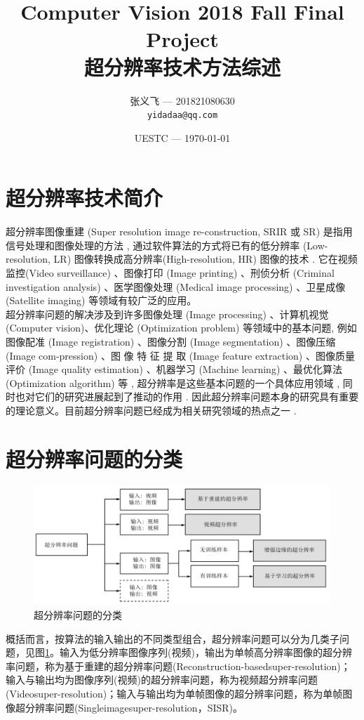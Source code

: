 \documentclass[]{article}
\title{Computer Vision 2018 Fall Final Project \\ \textbf{超分辨率技术方法综述}}
\author{张义飞 --- 201821080630\\ \texttt{yidadaa@qq.com}}
\date{\small{UESTC --- \today}}
\begin{document}
    \maketitle

    \section{超分辨率技术简介}
    超分辨率图像重建 (Super resolution image re-construction, SRIR 或 SR) 是指用信号处理和图像处理的方法 , 通过软件算法的方式将已有的低分辨率 (Low-resolution, LR) 图像转换成高分辨率(High-resolution, HR) 图像的技术 . 它在视频监控(Video surveillance) 、图像打印 (Image printing) 、刑侦分析 (Criminal investigation analysis) 、医学图像处理 (Medical image processing) 、卫星成像(Satellite imaging) 等领域有较广泛的应用。\\

    超分辨率问题的解决涉及到许多图像处理 (Image processing) 、计算机视觉 (Computer vision)、优化理论 (Optimization problem) 等领域中的基本问题, 例如图像配准 (Image registration) 、图像分割 (Image segmentation) 、图像压缩 (Image com-pression) 、图 像 特 征 提 取 (Image feature extraction) 、图像质量评价 (Image quality estimation) 、机器学习 (Machine learning) 、最优化算法 (Optimization algorithm) 等 , 超分辨率是这些基本问题的一个具体应用领域 , 同时也对它们的研究进展起到了推动的作用 . 因此超分辨率问题本身的研究具有重要的理论意义。目前超分辨率问题已经成为相关研究领域的热点之一 .

    \section{超分辨率问题的分类}
    \begin{figure}[htbp]
        \centering
        \includegraphics[width=\textwidth]{img/fig-1.png}
        \caption{超分辨率问题的分类}
        \label{fig1}
    \end{figure}
    概括而言，按算法的输入输出的不同类型组合，超分辨率问题可以分为几类子问题，见图\ref{fig1}。输入为低分辨率图像序列(视频)，输出为单帧高分辨率图像的超分辨率问题，称为基于重建的超分辨率问题(Reconstruction-basedsuper-resolution)；输入与输出均为图像序列(视频)的超分辨率问题，称为视频超分辨率问题(Videosuper-resolution)；输入与输出均为单帧图像的超分辨率问题，称为单帧图像超分辨率问题(Singleimagesuper-resolution，SISR)。\\ 
    
\end{document}
